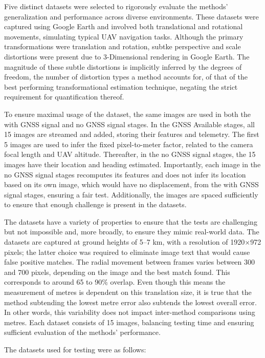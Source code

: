 Five distinct datasets were selected to rigorously evaluate the methods' generalization and performance across diverse environments. These datasets were captured using Google Earth and involved both translational and rotational movements, simulating typical UAV navigation tasks. Although the primary transformations were translation and rotation, subtke perspective and scale distortions were present due to 3-Dimensional rendering in Google Earth. The magnitude of these subtle distortions is implicitly inferred by the degrees of freedom, the number of distortion types a method accounts for, of that of the best performing transformational estimation technique, negating the strict requirement for quantification thereof.  

To ensure maximal usage of the dataset, the same images are used in both the with GNSS signal and no GNSS signal stages. In the GNSS Available stages, all 15 images are streamed and added, storing their features and telemetry. The first 5 images are used to infer the fixed pixel-to-meter factor, related to the camera focal length and UAV altitude. Thereafter, in the no GNSS signal stages, the 15 images have their location and heading estimated. Importantly, each image in the no GNSS signal stages recomputes its features and does not infer its location based on its own image, which would have no displacement, from the with GNSS signal stages, ensuring a fair test. Additionally, the images are spaced sufficiently to ensure that enough challenge is present in the datasets. 

The datasets have a variety of properties to ensure that the tests are challenging but not impossible and, more broadly, to ensure they mimic real-world data. The datasets are captured at ground heights of 5–7 km, with a resolution of 1920×972 pixels; the latter choice was required to eliminate image text that would cause false positive matches. The radial movement between frames varies between 300 and 700 pixels, depending on the image and the best match found. This corresponds to around 65 to 90\% overlap. Even though this means the measurement of metres is dependent on this translation size, it is true that the method subtending the lowest metre error also subtends the lowest overall error. In other words, this variability does not impact inter-method comparisons using metres. Each dataset consists of 15 images, balancing testing time and ensuring sufficient evaluation of the methods' performance.

The datasets used for testing were as follows:

